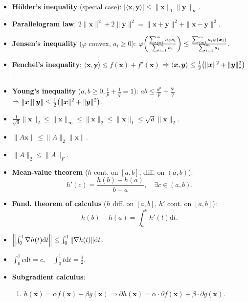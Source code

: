 \documentclass[8pt,a4paper]{extarticle}
\newcommand{\lft}{\mathopen{}\mathclose\bgroup\left}
\newcommand{\rgt}{\aftergroup\egroup\right}
\renewcommand{\vec}[1]{\bm{#1}}
\newcommand{\mat}[1]{#1}
\newenvironment{topic}[1]
{\textbf{\sffamily \colorbox{black}{\rlap{\textbf{\textcolor{white}{#1}}}\hspace{\linewidth}\hspace{-2\fboxsep}}} \\ \vspace{0.2cm}}
{}
\begin{document}
\begin{multicols*}{2}
\begin{topic}{Lemmas}
\begin{itemize}
            \item \textbf{H\"older's inequality} (special case): $|\langle \vec{x}, \vec{y} \rangle| \leq \| \vec{x} \|_1 \| \vec{y} \|_\infty$.
            \item \textbf{Parallelogram law}: $2 \| \vec{x} \|^2 + 2 \| \vec{y} \|^2 = \| \vec{x} + \vec{y} \|^2 + \| \vec{x} - \vec{y} \|^2$.
            \item \textbf{Jensen's inequality} ($\varphi$ convex, $a_i \geq 0$): $\varphi \lft( \frac{\sum_{i=1}^{m} a_i \vec{x}_i}{\sum_{i=1}^{m} a_i} \rgt) \leq \frac{\sum_{i=1}^{m} a_i \varphi(\vec{x}_i)}{\sum_{i=1}^{m} a_i}$.
            \item \textbf{Fenchel's inequality}: $\langle \vec{x}, \vec{y} \rangle \leq f(\vec{x}) + f^\star(\vec{x})$ $\Rightarrow \langle \vec{x}, \vec{y} \rangle \leq \frac{1}{2} \lft( \| \vec{x} \|^2 + \| \vec{y} \|^2_\star \rgt)$.
            \item \textbf{Young's inequality} ($a,b \geq 0, \frac{1}{p} + \frac{1}{q} = 1$): $ab \leq \frac{a^p}{p} + \frac{b^q}{q}$ \\ $\Rightarrow \| \vec{x} \| \| \vec{y} \| \leq \frac{1}{2} \lft( \| \vec{x} \|^2 + \| \vec{y} \|^2 \rgt)$.
            \item $\frac{1}{\sqrt{d}} \| \vec{x} \|_2 \leq \| \vec{x} \|_\infty \leq \| \vec{x} \|_2 \leq \| \vec{x} \|_1 \leq \sqrt{d} \| \vec{x} \|_2$.
            \item $\| \mat{A} \vec{x} \| \leq \| \mat{A} \|_2 \| \vec{x} \|$.
            \item $\| \mat{A} \|_2 \leq \| \mat{A} \|_F$.
            \item \textbf{Mean-value theorem} ($h$ cont. on $[a,b]$, diff. on $(a,b)$): \[
                      h'(c) = \frac{h(b) - h(a)}{b-a}, \quad \exists c \in (a,b).
                  \]
            \item \textbf{Fund. theorem of calculus} ($h$ diff. on $[a,b]$, $h'$ cont. on $[a,b]$): \[
                      h(b) - h(a) = \int_a^b h'(t) \mathrm{d}t.
                  \]
            \item $\lft\| \int_0^1 \nabla h(t) \mathrm{d}t \rgt\| \leq \int_0^1 \| \nabla h(t) \| \mathrm{d}t$.
            \item $\int_0^1 c \mathrm{d}t = c, \quad \int_0^1 t \mathrm{d}t = \frac{1}{2}$.
            \item \textbf{Subgradient calculus}:
                  \begin{enumerate}
                      \item $h(\vec{x}) = \alpha f(\vec{x}) + \beta g(\vec{x}) \Rightarrow \partial h(\vec{x}) = \alpha \cdot \partial f(\vec{x}) + \beta \cdot \partial g(\vec{x})$.

\end{enumerate}
\end{itemize}
\end{topic}
\end{multicols*}
\end{document}
